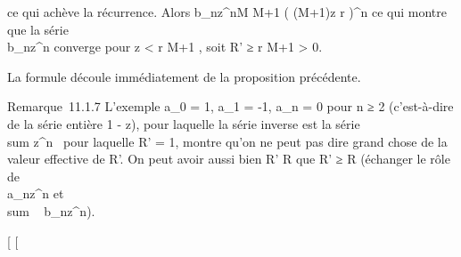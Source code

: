 \documentclass[]{article}
\begin{document}
ce qui achève la récurrence. Alors
b_nz^n\leq M \over
M+1 \left ( (M+1)z
\over r \right )^n ce qui
montre que la série \\\sum
 b_nz^n converge pour z
< r \over M+1 , soit R' ≥ r
\over M+1 > 0.

La formule découle immédiatement de la proposition précédente.

Remarque~11.1.7 L'exemple a_0 = 1, a_1 = -1,
a_n = 0 pour n ≥ 2 (c'est-à-dire de la série entière 1 - z),
pour laquelle la série inverse est la série
\\sum  z^n~
pour laquelle R' = 1, montre qu'on ne peut pas dire grand chose de la
valeur effective de R'. On peut avoir aussi bien R' \leq R que R' ≥ R
(échanger le rôle de \\\sum
 a_nz^n et
\\sum ~
b_nz^n).

[
[
\end{document}
